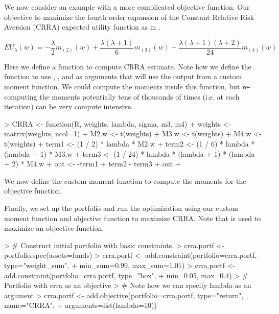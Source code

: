 \documentclass[a4paper]{article}
\begin{document}
We now consider an example with a more complicated objective function. Our objective to maximize the fourth order expansion of the Constant Relative Risk Aversion (CRRA) expected utility function as in \citep{Boudt2014}.

\begin{equation*}
EU_{\lambda}(w) = - \frac{\lambda}{2} m_{(2)}(w) +
\frac{\lambda (\lambda + 1)}{6} m_{(3)}(w) -
\frac{\lambda (\lambda + 1) (\lambda + 2)}{24} m_{(4)}(w)
\end{equation*}

Here we define a function to compute CRRA estimate. Note how we define the function to use , , and  as arguments that will use the output from a custom moment function. We could compute the moments inside this function, but re-computing the moments potentially tens of thousands of times (i.e. at each iteration) can be very compute intensive.

\begin{Schunk}
\begin{Sinput}
> CRRA <- function(R, weights, lambda, sigma, m3, m4){
+   weights <- matrix(weights, ncol=1)
+   M2.w <- t(weights) %*% sigma %*% weights
+   M3.w <- t(weights) %*% m3 %*% (weights %x% weights)
+   M4.w <- t(weights) %*% m4 %*% (weights %x% weights %x% weights)
+   term1 <- (1 / 2) * lambda * M2.w
+   term2 <- (1 / 6) * lambda * (lambda + 1) * M3.w
+   term3 <- (1 / 24) * lambda * (lambda + 1) * (lambda + 2) * M4.w
+   out <- -term1 + term2 - term3
+   out
+ }
\end{Sinput}
\end{Schunk}

We now define the custom moment function to compute the moments for the objective function.
\begin{Schunk}
\end{Schunk}

Finally, we set up the portfolio and run the optimization using our custom moment function and objective function to maximize CRRA. Note that  is used to maximize an objective function.
\begin{Schunk}
\begin{Sinput}
> # Construct initial portfolio with basic constraints.
> crra.portf <- portfolio.spec(assets=funds)
> crra.portf <- add.constraint(portfolio=crra.portf, type="weight_sum", 
+                              min_sum=0.99, max_sum=1.01)
> crra.portf <- add.constraint(portfolio=crra.portf, type="box",
+                              min=0.05, max=0.4)
> # Portfolio with crra as an objective
> # Note how we can specify lambda as an argument
> crra.portf <- add.objective(portfolio=crra.portf, type="return", name="CRRA", 
+                             arguments=list(lambda=10))
\end{Sinput}
\end{Schunk}
\end{document}
